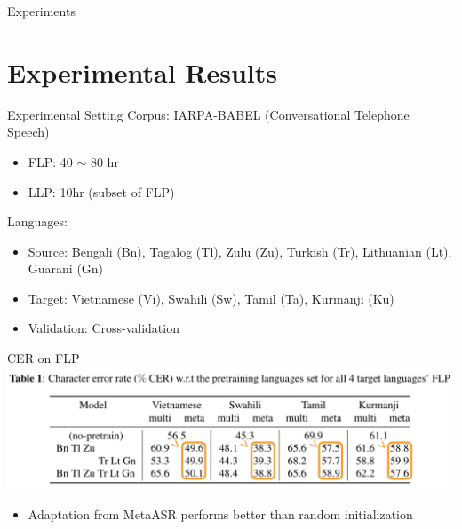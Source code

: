 \documentclass{beamer}
\begin{document}


\begin{frame}
	\begin{center}
    \LARGE{Experiments}
	\end{center}
\end{frame}

\section{Experimental Results}
\begin{frame}[t]{Experimental Setting}
  Corpus: IARPA-BABEL (Conversational Telephone Speech)
  \begin{itemize}
    \item FLP: 40 $\sim$ 80 hr
    \item LLP: 10hr (subset of FLP)
  \end{itemize}
  \pause
  Languages:
  \begin{itemize}
    \item Source: Bengali (Bn), Tagalog (Tl), Zulu (Zu), Turkish (Tr), Lithuanian (Lt), Guarani (Gn)
    \item Target: Vietnamese (Vi), Swahili (Sw), Tamil (Ta), Kurmanji (Ku)
    \item Validation: Cross-validation
  \end{itemize}
\end{frame}

\begin{frame}[t]{CER on FLP}
  \center \includegraphics[width=1.0\textwidth]{fig/flp_hl1.png}

  \begin{itemize}
    \item Adaptation from MetaASR performs better than random initialization
  \end{itemize}
\end{frame}
\end{document}
